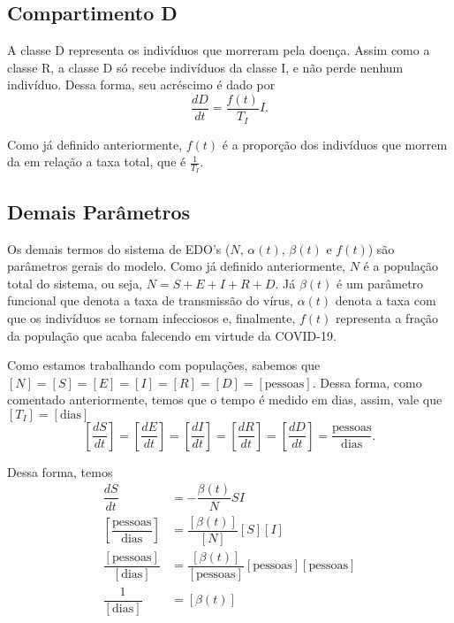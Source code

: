\documentclass{article}
\begin{document}
\subsection{Compartimento D}

A classe D representa os indivíduos que morreram pela doença. Assim como a classe R, a classe D só recebe indivíduos da classe I, e não perde nenhum indivíduo. Dessa forma, seu acréscimo é dado por
\[\dfrac{dD}{dt} = \dfrac{f(t)}{T_I}I.\]

Como já definido anteriormente, $f(t)$ é a proporção dos indivíduos que morrem da em relação a taxa total, que é $\frac{1}{T_I}$. 

\subsection{Demais Parâmetros}

Os demais termos do sistema de EDO's ($N$, $\alpha(t)$, $\beta(t)$ e $f(t)$) são parâmetros gerais do modelo. Como já definido anteriormente, $N$ é a população total do sistema, ou seja, $N = S + E + I + R + D$. Já $\beta(t)$ é um parâmetro funcional que denota a taxa de transmissão do vírus, $\alpha(t)$ denota a taxa com que os indivíduos se tornam infecciosos e, finalmente, $f(t)$ representa a fração da população que acaba falecendo em virtude da COVID-19.

% 
Como estamos trabalhando com populações, sabemos que $[N] = [S] = [E] = [I] = [R] = [D] = [\text{pessoas}]$. Dessa forma, como comentado %
anteriormente, temos que o tempo é medido em dias, assim, vale que $[T_I] = [\text{dias}]$
\[\left[\dfrac{dS}{dt}\right] = \left[\dfrac{dE}{dt}\right] = \left[\dfrac{dI}{dt}\right] = \left[\dfrac{dR}{dt}\right] = \left[\dfrac{dD}{dt}\right] = \dfrac{\text{pessoas}}{\text{dias}}.\]

Dessa forma, temos
\begin{equation*}
    \begin{split}
        \dfrac{dS}{dt} & = -\dfrac{\beta(t)}{N}SI \\
        \left[\dfrac{\text{pessoas}}{\text{dias}}\right] & = \dfrac{[\beta(t)]}{[N]}[S][I] \\
        \dfrac{[\text{pessoas}]}{[\text{dias}]} & = \dfrac{[\beta(t)]}{[\text{pessoas}]}[\text{pessoas}][\text{pessoas}] \\
        \dfrac{1}{[\text{dias}]} & = [\beta(t)]
    \end{split}
\end{equation*}
\end{document}
